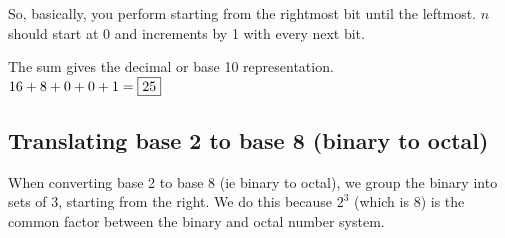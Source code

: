 \documentclass{article}
\begin{document}
\begin{center}
So, basically, you perform  starting from the rightmost bit until the leftmost. $n$ should start at 0 and increments by 1 with every next bit. \\
\vspace{\baselineskip}
  
  \vspace{\baselineskip}
  The sum gives the decimal or base 10 representation. \\
  \vspace{\baselineskip}
  $16+8+0+0+1=\fbox{25}$
\end{center}

\subsection{Translating base 2 to base 8 (binary to octal)}
When converting base 2 to base 8 (ie binary to octal), we group the binary into sets of 3, starting from the right. We do this because $2^3$ (which is 8) is the common factor between the binary and octal number system.
\end{document}
